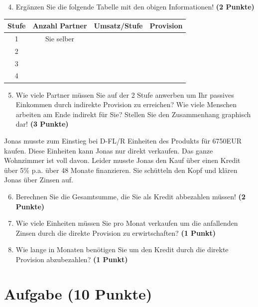 \documentclass[a4paper, 9pt]{scrartcl}\usepackage[]{graphicx}\usepackage[]{xcolor}
\begin{document}
\begin{enumerate}
  \setcounter{enumi}{3}
\item Ergänzen Sie die folgende Tabelle mit den obigen Informationen! \textbf{(2 Punkte)}
\end{enumerate}

\begin{center}
\begin{tabular}{c|c|c|c}
  \toprule
  \textbf{Stufe} & \textbf{Anzahl Partner}  & \textbf{Umsatz/Stufe} & \textbf{Provision}\\
  \midrule
  1 & Sie selber  &  & \\ \midrule
  2 &   &  &  \\ \midrule
  3 &   &  &  \\ \midrule
  4 &   &  &  \\
  \bottomrule
\end{tabular}
\end{center}

\begin{enumerate}
  \setcounter{enumi}{4}
\item Wie viele Partner müssen Sie auf der 2 Stufe anwerben um Ihr passives Einkommen durch indirekte Provision zu erreichen? Wie viele Menschen arbeiten am Ende indirekt für Sie? Stellen Sie den Zusammenhang graphisch dar!  \textbf{(3 Punkte)}
\end{enumerate}

Jonas musste zum Einstieg bei D-FL/R Einheiten des Produkts für 6750EUR kaufen. Diese Einheiten kann Jonas nur direkt verkaufen. Das ganze Wohnzimmer ist voll davon. Leider musste Jonas den Kauf über einen Kredit über 5\% p.a. über 48 Monate finanzieren. Sie schütteln den Kopf und klären Jonas über Zinsen auf.

\begin{enumerate}
  \setcounter{enumi}{5}
\item Berechnen Sie die Gesamtsumme, die Sie als Kredit abbezahlen müssen! \textbf{(2 Punkte)}
\item Wie viele Einheiten müssen Sie pro Monat verkaufen um die anfallenden Zinsen durch die direkte Provision zu erwirtschaften? \textbf{(1 Punkt)}
\item Wie lange in Monaten benötigen Sie um den Kredit durch die direkte Provision abzubezahlen? \textbf{(1 Punkt)}
\end{enumerate} 
\clearpage

\section{Aufgabe \hfill (10 Punkte)}
\end{document}
